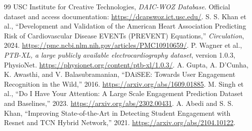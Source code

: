 \documentclass[11pt,a4paper]{article}
\begin{document}
\begin{thebibliography}{99}
 USC Institute for Creative Technologies, \emph{DAIC-WOZ Database}. Official dataset and access documentation: \url{https://dcapswoz.ict.usc.edu/}.
 S. S. Khan et al., ``Development and Validation of the American Heart Association Predicting Risk of Cardiovascular Disease EVENTs (PREVENT) Equations,'' \emph{Circulation}, 2024. \url{https://pmc.ncbi.nlm.nih.gov/articles/PMC10910659/}.
 P. Wagner et al., \emph{PTB-XL, a large publicly available electrocardiography dataset}, version 1.0.3, PhysioNet. \url{https://physionet.org/content/ptb-xl/1.0.3/}.
 A. Gupta, A. D'Cunha, K. Awasthi, and V. Balasubramanian, ``DAiSEE: Towards User Engagement Recognition in the Wild,'' 2016. \url{https://arxiv.org/abs/1609.01885}.
 M. Singh et al., ``Do I Have Your Attention: A Large Scale Engagement Prediction Dataset and Baselines,'' 2023. \url{https://arxiv.org/abs/2302.00431}.
 A. Abedi and S. S. Khan, ``Improving State-of-the-Art in Detecting Student Engagement with Resnet and TCN Hybrid Network,'' 2021. \url{https://arxiv.org/abs/2104.10122}.
\end{thebibliography}
\endgroup
\end{document}
